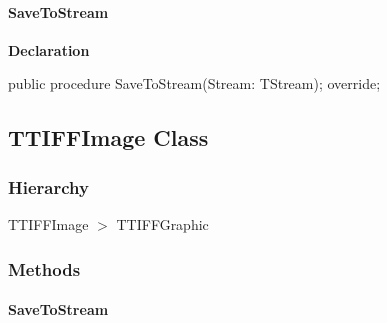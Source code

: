 \documentclass{report}
\newif\ifpdf
\begin{document}
\paragraph*{SaveToStream}\hspace*{\fill}

\label{opbitmapformats.TPNGImage-SaveToStream}
\begin{list}{}{
\setlength{\itemindent}{0cm}
\setlength{\listparindent}{0cm}
\setlength{\leftmargin}{\evensidemargin}
\addtolength{\leftmargin}{\tmplength}
\settowidth{\labelsep}{X}
\addtolength{\leftmargin}{\labelsep}
\setlength{\labelwidth}{\tmplength}
}
\item[\textbf{Declaration}\hfill]
\ifpdf
\begin{flushleft}
\fi
\begin{ttfamily}
public procedure SaveToStream(Stream: TStream); override;\end{ttfamily}

\ifpdf
\end{flushleft}
\fi

\end{list}
\ifpdf
\subsection*{\large{\textbf{TTIFFImage Class}}\normalsize\hspace{1ex}\hrulefill}
\else
\subsection*{TTIFFImage Class}
\fi
\label{opbitmapformats.TTIFFImage}
\subsubsection*{\large{\textbf{Hierarchy}}\normalsize\hspace{1ex}\hfill}
TTIFFImage {$>$} TTIFFGraphic
\subsubsection*{\large{\textbf{Methods}}\normalsize\hspace{1ex}\hfill}
\paragraph*{SaveToStream}\hspace*{\fill}
\end{document}
